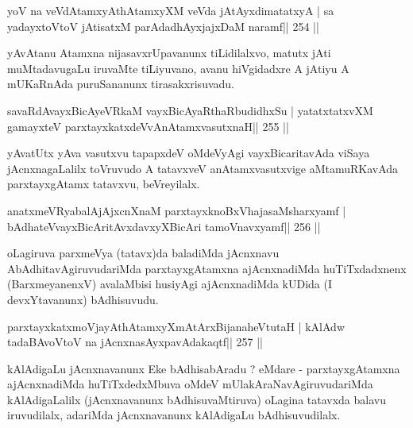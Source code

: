 
\begin{shl}
yoV na veVdA\s\s tamxyAthAtamxyXM veVda jAtAyxdimatatxyA |
sa yadayxtoV\s toV jAtisatxM parAdadhAyxjajxDaM naramf\hfill || 254 ||
\end{shl}

\begin{artha}
yAvAtanu Atamxna nijasavxrUpavanunx tiLidilalxvo, matutx jAti muMtada\-vugaLu iruvaMte tiLiyuvano, avanu hiVgidadxre A jAtiyu A mUKaRnAda puruSananunx tirasakxrisuvadu.
\end{artha}


\begin{shl}
savaRdA\s vayxBicAyeVRkaM vayxBicAyaRthaRbudidhxSu |
yatatxtatxvXM gamayxteV parxtayxkatxdeVvAnAtamxvasutxnaH\hfill || 255 ||
\end{shl}

\begin{artha}
yAvatUtx yAva vasutxvu tapapxdeV oMdeVyAgi vayxBicaritavAda viSaya jAcnxnagaLalilx toVruvudo A tatavxveV anAtamxvasutxvige aMtamuRKavAda parxtayxgAtamx tatavxvu, beVreyilalx.
\end{artha}


\begin{shl}
anatxmeVRyabalAjAjxcnXnaM parxtayxknoBxVhajasaMsharxyamf |
bAdhateV\s vayxBicAritAvxdavxyXBicAri tamoVnavxyamf\hfill || 256 ||
\end{shl}

\begin{artha}
oLagiruva parxmeVya (tatavx)da baladiMda jAcnxnavu AbAdhitavAgiruvudariMda parxtayxgAtamxna ajAcnxnadiMda huTiTxdadxnenx (BarxmeyanenxV) avalaMbisi husiyAgi ajAcnxnadiMda kUDida (I devxYtavanunx) bAdhisuvudu.
\end{artha}

\begin{shl}
parxtayxkatxmoVjayAthAtamxyXmAtArxBijanaheVtutaH |
kAlAdw tadaBAvoV\s toV na jAcnxnasAyxpavAdakaqtf\hfill || 257 ||
\end{shl}

\begin{artha}
kAlAdigaLu jAcnxnavanunx Eke bAdhisabAradu ? eMdare - parxtayxgAtamxna ajAcnxnadiMda huTiTxdedxMbuva oMdeV mUlakAraNavAgiruvudariMda kAlAdigaLalilx (jAcnxnavanunx bAdhisuvaMtiruva) oLagina tatavxda balavu iruvudilalx, adariMda jAcnxnavanunx kAlAdigaLu bAdhisuvudilalx.
\end{artha}

